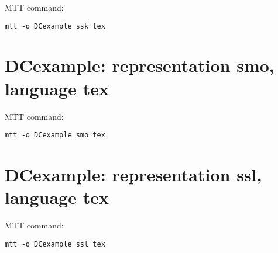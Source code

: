 MTT command:
\begin{verbatim}
mtt -o DCexample ssk tex 
\end{verbatim}
  


\section{\textbf{DCexample}: representation \textbf{smo}, language \textbf{tex}}
\label{sec:DCexample_smo.tex}


MTT command:
\begin{verbatim}
mtt -o DCexample smo tex 
\end{verbatim}
  


\section{\textbf{DCexample}: representation \textbf{ssl}, language \textbf{tex}}
\label{sec:DCexample_ssl.tex}


MTT command:
\begin{verbatim}
mtt -o DCexample ssl tex 
\end{verbatim}
  
